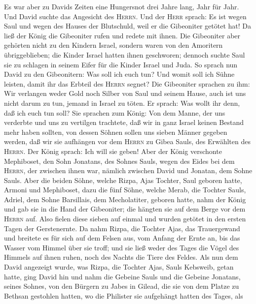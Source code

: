  Es war aber zu Davids Zeiten eine Hungersnot drei Jahre
lang, Jahr für Jahr. Und David suchte das Angesicht des \textsc{Herrn}.
Und der \textsc{Herr} sprach: Es ist wegen Saul und wegen des Hauses der
Blutschuld, weil er die Gibeoniter getötet hat!  Da ließ
der König die Gibeoniter rufen und redete mit ihnen. Die Gibeoniter aber
gehörten nicht zu den Kindern Israel, sondern waren von den Amoritern
übriggeblieben; die Kinder Israel hatten ihnen geschworen; dennoch
suchte Saul sie zu schlagen in seinem Eifer für die Kinder Israel und
Juda.  So sprach nun David zu den Gibeonitern: Was soll
ich euch tun? Und womit soll ich Sühne leisten, damit ihr das Erbteil
des \textsc{Herrn} segnet?  Die Gibeoniter sprachen zu
ihm: Wir verlangen weder Gold noch Silber von Saul und seinem Hause,
auch ist uns nicht darum zu tun, jemand in Israel zu töten. Er sprach:
Was wollt ihr denn, daß ich euch tun soll?  Sie sprachen
zum König: Von dem Manne, der uns verderbte und uns zu vertilgen
trachtete, daß wir in ganz Israel keinen Bestand mehr haben sollten,
 von dessen Söhnen sollen uns sieben Männer gegeben
werden, daß wir sie aufhängen vor dem \textsc{Herrn} zu Gibea Sauls, des
Erwählten des \textsc{Herrn}. Der König sprach: Ich will sie geben!
 Aber der König verschonte Mephiboset, den Sohn Jonatans,
des Sohnes Sauls, wegen des Eides bei dem \textsc{Herrn}, der zwischen
ihnen war, nämlich zwischen David und Jonatan, dem Sohne Sauls.
 Aber die beiden Söhne, welche Rizpa,
Ajas\textquotesingle{} Tochter, Saul geboren hatte, Armoni und
Mephiboset, dazu die fünf Söhne, welche Merab, die Tochter Sauls,
Adriel, dem Sohne Barsillais, dem Mecholatiter, geboren hatte, nahm der
König  und gab sie in die Hand der Gibeoniter; die hängten
sie auf dem Berge vor dem \textsc{Herrn} auf. Also fielen diese sieben
auf einmal und wurden getötet in den ersten Tagen der Gerstenernte.
 Da nahm Rizpa, die Tochter Ajas, das Trauergewand und
breitete es für sich auf dem Felsen aus, vom Anfang der Ernte an, bis
das Wasser vom Himmel über sie troff; und sie ließ weder des Tages die
Vögel des Himmels auf ihnen ruhen, noch des Nachts die Tiere des Feldes.
 Als nun dem David angezeigt wurde, was Rizpa, die
Tochter Ajas, Sauls Kebsweib, getan hatte,  ging David
hin und nahm die Gebeine Sauls und die Gebeine Jonatans, seines Sohnes,
von den Bürgern zu Jabes in Gilead, die sie von dem Platze zu Bethsan
gestohlen hatten, wo die Philister sie aufgehängt hatten des Tages, als
